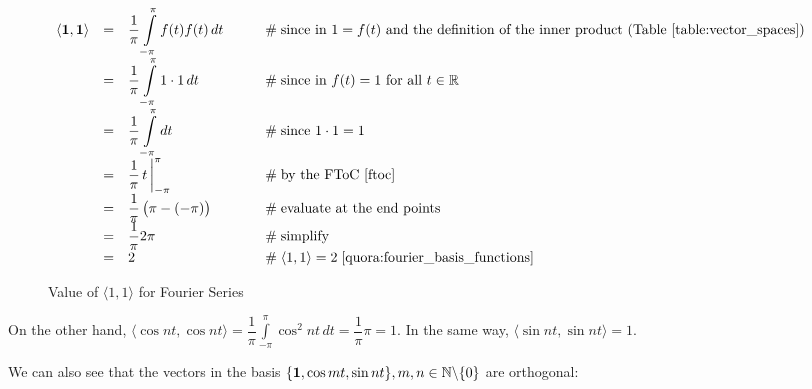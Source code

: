 \documentclass{article}
\theoremstyle{definition}
\begin{document}
\bigskip
\begin{figure}[H]
   {								%
    \begin{math}
      \begin{array}{llll}
        \langle {\bf 1},{\bf 1} \rangle
        &=& {\displaystyle \frac{1}{\pi}\int\limits_{-\pi}^{\pi} f(t) f(t) \, dt}
     	   &\hspace{2em} \mathrel{\#} \text{since in $1 = f(t)$ and the 
										 definition of the inner product 
										 (Table \ref{table:vector_spaces})} \\
        &=& {\displaystyle \frac{1}{\pi}\int\limits_{-\pi}^{\pi} 1 \cdot 1 \, dt}
     	   &\hspace{2em} \mathrel{\#} \text{since in $f(t) = 1$ for all 
										 $t \in \mathbb{R}$} \\
	   &=& {\displaystyle \frac{1}{\pi}\int\limits_{-\pi}^{\pi} dt}
	  	   &\hspace{2em} \mathrel{\#} \text{since $1 \cdot 1 = 1$} \\
	   &=& {\displaystyle \frac{1}{\pi}  \, t \, \bigg |^{\pi}_{-\pi}}
		   &\hspace{2em} \mathrel{\#} \text{by the FToC \cite{ftoc}} \\
	   &=& {\displaystyle \frac{1}{\pi} \left (\pi - (-\pi) \right )}
		   &\hspace{2em} \mathrel{\#} \text{evaluate at the end points} \\
	   &=& {\displaystyle \frac{1}{\pi} 2\pi}
		   &\hspace{2em} \mathrel{\#} \text{simplify} \\
	   &=& {\displaystyle 2}
		   &\hspace{2em} \mathrel{\#} \langle 1,1 \rangle = 2 \; 
								   \cite{quora:fourier_basis_functions}
     \end{array}
   \end{math}
 }
 \caption{Value of $\langle 1,1 \rangle$ for Fourier Series}
 \label{figure:fourier_inner_product}
\end{figure}

\bigskip
\noindent
On the other hand, $\langle \cos nt, \cos nt \rangle =
{\displaystyle \dfrac{1}{\pi} \int\limits_{-\pi}^{\pi} \cos^2 nt
\,dt = \dfrac{1}{\pi} \pi = 1}$. In the same way, $\langle \sin
nt, \sin nt \rangle = 1$.
  
 
\bigskip
\noindent
 We can also see that the vectors in the basis $\{{\bf 1}, \cos mt,
 \sin nt\}, m,n \in \mathbb{N}\backslash\{0\}$ are 
 orthogonal:
 
\end{document}
